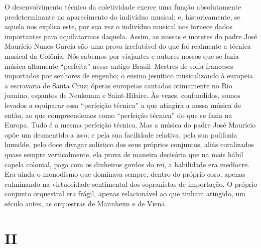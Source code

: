 O desenvolvimento técnico da coletividade exerce uma função
absolutamente predeterminante no aparecimento do indivíduo musical; e,
historicamente, se aquela nos explica este, por sua vez o indivíduo
musical nos fornece dados importantes para aquilatarmos daquela. Assim,
as missas e motetes do padre José Maurício Nunes Garcia são uma prova
irrefutável do que foi realmente a técnica musical da Colônia. Nós
sabemos por viajantes e autores nossos que se fazia música altamente
``perfeita'' nesse antigo Brasil. Mestres de solfa franceses importados
por senhores de engenho; o ensino jesuítico musicalizando à europeia a
escravaria de Santa Cruz; óperas europeias cantadas otimamente no Rio
joanino, espantos de Neukomm e Saint-Hilaire. Às vezes, confundidos,
somos levados a equiparar essa ``perfeição técnica'' a que atingira a
nossa música de então, ao que compreendemos como ``perfeição técnica''
do que se fazia na Europa. Tudo é a mesma perfeição técnica. Mas a
música do padre José Maurício opõe um desmentido a isso; e pela sua
facilidade relativa, pela sua polifonia humilde, pelo doce divagar
solístico dos seus próprios conjuntos, aliás coralizados quase sempre
verticalmente, ela prova de maneira decisória que na mais hábil capela
colonial, paga com os dinheiros gordos do rei, a habilidade era
medíocre. Era ainda o monodismo que dominava sempre, dentro do próprio
coro, apenas culminando na virtuosidade sentimental dos sopranistas de
importação. O próprio conjunto orquestral era frágil, apenas
relacionável ao que tinham atingido, um século antes, as orquestras de
Mannheim e de Viena.

\section{II}

